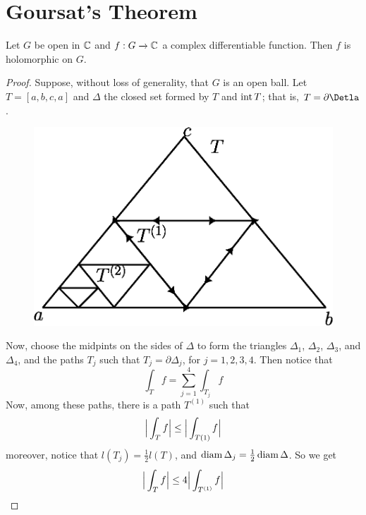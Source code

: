\section{Goursat's Theorem}

\begin{theorem}\label{4.8.1}
    Let $G$ be open in  $\mathbb{C}$ and  $f:G \xrightarrow{} \mathbb{C}$ a complex
    differentiable function. Then $f$ is holomorphic on $G$.
\end{theorem}
\begin{proof}
    Suppose, without loss of generality, that $G$ is an open ball. Let
    $T=[a,b,c,a]$ and $\Delta$ the closed set formed by $T$ and $\operatorname{int}{T}$; that
    is, $T=\partial{\Detla}$.

    \begin{figure}[h]
        \centering
        \includegraphics[scale=0.5]{Figures/Chapter4/goursat_triangle.eps}
        \caption{}
        \label{figure_4.5}
    \end{figure}

    Now, choose the midpints on the sides of $\Delta$ to form the triangles
    $\Delta_1$, $\Delta_2$, $\Delta_3$, and $\Delta_4$, and the paths $T_j$ such
    that  $T_j=\partial{\Delta_j}$, for $j=1,2,3,4$. Then notice that
    \begin{equation*}
        \int_T{f}=\sum_{j=1}^4{\int_{T_j}{f}}
    \end{equation*}
    Now, among these paths, there is a path $T^{(1)}$ such that
    \begin{equation*}
        \Big{|} \int_T{f} \Big{|} \leq \Big{|} \int_{T(1)}{f} \Big{|}
    \end{equation*}
    moreover, notice that $l(T_j)=\frac{1}{2}l(T)$, and
    $\operatorname{diam}{\Delta_j}=\frac{1}{2}\operatorname{diam}{\Delta}$. So we get
    \begin{equation*}
        \Big{|} \int_T{f} \Big{|} \leq 4\Big{|} \int_{T^{(1)}}{f} \Big{|}
    \end{equation*}


\end{proof}

